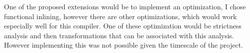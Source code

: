 \documentclass[float=false, crop=false]{standalone}
\begin{document}
One of the proposed extensions would be to implement an optimization,
I chose functional inlining, however there are other optimizations, which
would work especially well for this compiler. One of these
optimization would be strictness analysis and
then transformations that can be associated with this analysis. 
However implementing this was not possible given the timescale of the project.



\end{document}
